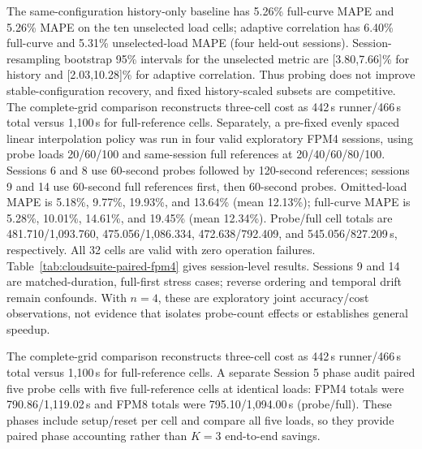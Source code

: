 \documentclass[sigconf, review, anonymous, balance=false]{acmart}
\begin{document}
The same-configuration history-only baseline has 5.26\% full-curve MAPE and 5.26\% MAPE on the ten unselected load cells; adaptive correlation has 6.40\% full-curve and 5.31\% unselected-load MAPE (four held-out sessions). Session-resampling bootstrap 95\% intervals for the unselected metric are [3.80,7.66]\% for history and [2.03,10.28]\% for adaptive correlation. Thus probing does not improve stable-configuration recovery, and fixed history-scaled subsets are competitive. The complete-grid comparison reconstructs three-cell cost as 442\,s runner/466\,s total versus 1,100\,s for full-reference cells. Separately, a pre-fixed evenly spaced linear interpolation policy was run in four valid exploratory FPM4 sessions, using probe loads 20/60/100 and same-session full references at 20/40/60/80/100. Sessions 6 and 8 use 60-second probes followed by 120-second references; sessions 9 and 14 use 60-second full references first, then 60-second probes. Omitted-load MAPE is 5.18\%, 9.77\%, 19.93\%, and 13.64\% (mean 12.13\%); full-curve MAPE is 5.28\%, 10.01\%, 14.61\%, and 19.45\% (mean 12.34\%). Probe/full cell totals are 481.710/1,093.760, 475.056/1,086.334, 472.638/792.409, and 545.056/827.209\,s, respectively. All 32 cells are valid with zero operation failures. Table~\ref{tab:cloudsuite-paired-fpm4} gives session-level results. Sessions 9 and 14 are matched-duration, full-first stress cases; reverse ordering and temporal drift remain confounds. With $n=4$, these are exploratory joint accuracy/cost observations, not evidence that isolates probe-count effects or establishes general speedup.

The complete-grid comparison reconstructs three-cell cost as 442\,s runner/466\,s total versus 1,100\,s for full-reference cells. A separate Session 5 phase audit paired five probe cells with five full-reference cells at identical loads: FPM4 totals were 790.86/1,119.02\,s and FPM8 totals were 795.10/1,094.00\,s (probe/full). These phases include setup/reset per cell and compare all five loads, so they provide paired phase accounting rather than $K=3$ end-to-end savings.
\end{document}
